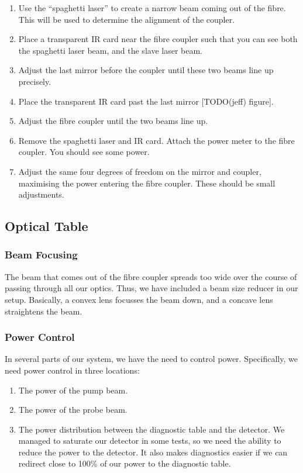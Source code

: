 \begin{enumerate}
 \item Use the ``spaghetti laser'' to create a narrow beam coming out of the fibre.  This will be used to determine the alignment of the coupler.
 \item Place a transparent IR card near the fibre coupler such that you can see both the spaghetti laser beam, and the slave laser beam.
 \item Adjust the last mirror before the coupler until these two beams line up precisely.
 \item Place the transparent IR card past the last mirror [TODO(jeff) figure].
 \item Adjust the fibre coupler until the two beams line up.
 \item Remove the spaghetti laser and IR card.  Attach the power meter to the fibre coupler.  You should see some power.
 \item Adjust the same four degrees of freedom on the mirror and coupler, maximising the power entering the fibre coupler.  These should be small adjustments.
\end{enumerate}

\subsection{Optical Table}
    \subsubsection{Beam Focusing}

The beam that comes out of the fibre coupler spreads too wide over the course of passing through all our optics.  Thus, we have included a beam size reducer in our setup.  Basically, a convex lens focusses the beam down, and a concave lens straightens the beam.

    \subsubsection{Power Control}

In several parts of our system, we have the need to control power.  Specifically, we need power control in three locations:

\begin{enumerate}
    \item The power of the pump beam.
    \item The power of the probe beam.
    \item The power distribution between the diagnostic table and the detector.  We managed to saturate our detector in some tests, so we need the ability to reduce the power to the detector.  It also makes diagnostics easier if we can redirect close to 100\% of our power to the diagnostic table.
\end{enumerate}

